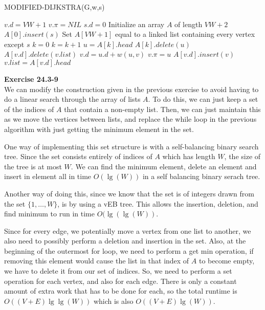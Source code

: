 \documentclass{article}
\begin{document}
\begin{algorithm}
\caption{MODIFIED-DIJKSTRA(G,w,s)}
\begin{algorithmic}[1]
	$v.d = VW + 1$
	$v.\pi = NIL$
\EndFor
\State $s.d = 0$
\State Initialize an array $A$ of length $VW + 2$
\State $A[0].insert(s)$
\State Set $A[VW + 1]$ equal to a linked list containing every vertex except $s$
\State $k = 0$
			\State $k = k + 1$
		\EndWhile
	\State $u = A[k].head$
	\State $A[k].delete(u)$
			\State $A[v.d].delete(v.list)$
			\State $v.d = u.d + w(u,v)$
			\State $v.\pi = u$
			\State $A[v.d].insert(v)$	
			\State $v.list = A[v.d].head$
		\EndIf
	\EndFor
\EndFor
\end{algorithmic}
\end{algorithm}


\noindent\textbf{Exercise 24.3-9}\\
We can modify the construction given in the previous exercise to avoid having to do a linear search through the array of lists $A$. To do this, we can just keep a set of the indices of $A$ that contain a non-empty list. Then, we can just maintain this as we move the vertices between lists, and replace the while loop in the previous algorithm with just getting the minimum element in the set.

One way of implementing this set structure is with a self-balancing binary search tree. Since the set consists entirely of indices of $A$ which has length $W$, the size of the tree is at most $W$. We can find the minimum element, delete an element and insert in element all in time $O(\lg(W))$ in a self balancing binary serach tree.

Another way of doing this, since we know that the set is of integers drawn from the set $\{1,\ldots, W\}$, is by using a vEB tree. This allows the insertion, deletion, and find minimum to run in time $O(\lg(\lg(W))$.

Since for every edge, we potentially move a vertex from one list to another, we also need to possibly perform a deletion and insertion in the set. Also, at the beginning of the outermost for loop, we need to perform a get min operation, if removing this element would cause the list in that index of $A$ to become empty, we have to delete it from our set of indices. So, we need to perform a set operation for each vertex, and also for each edge. There is only a constant amount of extra work that has to be done for each, so the total runtime is $O((V+E)\lg\lg(W))$ which is also $O((V+E)\lg(W))$.\\
\end{document}
